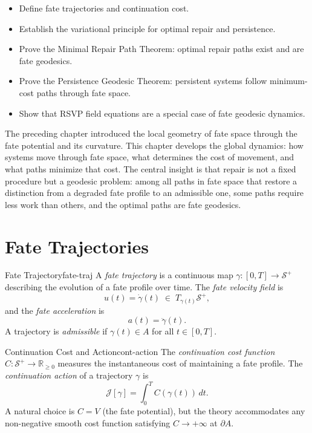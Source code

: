 \documentclass[12pt,twoside,openright]{book}
\newcommand{\fateSpace}{\mathcal{S}}
\newcommand{\admRegion}{A}
\newenvironment{objectives}{%
  \begin{tcolorbox}[colback=DistBlue!5,colframe=DistBlue,
    title={\faCheckCircle\enspace Chapter Objectives},
    fonttitle=\sffamily\bfseries\color{white},
    attach boxed title to top left={yshift=-2mm,xshift=4mm},
    boxed title style={colback=DistBlue},breakable]
  \begin{itemize}[leftmargin=*,nosep]}{%
  \end{itemize}\end{tcolorbox}\vspace{1em}}
\providecommand{\fatePos}{\fateSpace^{+}}
\providecommand{\admRegion}{A}
\providecommand{\fatePot}{V}
\providecommand{\fateTan}[1]{T_{#1}\fatePos}
\providecommand{\contCost}{C}
\providecommand{\contAction}{\mathcal{J}}
\providecommand{\fateTraj}{\gamma}
\providecommand{\fateVel}{u}
\providecommand{\fateAcc}{a}
\begin{document}
\begin{objectives}
\item Define fate trajectories and continuation cost.
\item Establish the variational principle for optimal repair
  and persistence.
\item Prove the Minimal Repair Path Theorem: optimal repair
  paths exist and are fate geodesics.
\item Prove the Persistence Geodesic Theorem: persistent
  systems follow minimum-cost paths through fate space.
\item Show that RSVP field equations are a special case of
  fate geodesic dynamics.
\end{objectives}

The preceding chapter introduced the local geometry of fate
space through the fate potential and its curvature. This
chapter develops the global dynamics: how systems move through
fate space, what determines the cost of movement, and what
paths minimize that cost. The central insight is that repair
is not a fixed procedure but a geodesic problem: among all
paths in fate space that restore a distinction from a degraded
fate profile to an admissible one, some paths require less
work than others, and the optimal paths are fate geodesics.

\section{Fate Trajectories}

\begin{definition}{Fate Trajectory}{fate-traj}
A \emph{fate trajectory} is a continuous map
$\fateTraj:[0,T]\to\fatePos$ describing the evolution of
a fate profile over time. The \emph{fate velocity field} is
\[
  \fateVel(t) = \dot{\fateTraj}(t)
  \;\in\; \fateTan{\fateTraj(t)},
\]
and the \emph{fate acceleration} is
\[
  \fateAcc(t) = \ddot{\fateTraj}(t).
\]
A trajectory is \emph{admissible} if $\fateTraj(t)\in\admRegion$
for all $t\in[0,T]$.
\end{definition}

\begin{definition}{Continuation Cost and Action}{cont-action}
The \emph{continuation cost function}
$\contCost:\fatePos\to\mathbb{R}_{\ge0}$ measures the
instantaneous cost of maintaining a fate profile. The
\emph{continuation action} of a trajectory $\fateTraj$ is
\[
  \contAction[\fateTraj]
  = \int_0^T \contCost(\fateTraj(t))\,dt.
\]
A natural choice is $\contCost = \fatePot$ (the fate potential),
but the theory accommodates any non-negative smooth cost function
satisfying $\contCost\to+\infty$ at $\partial\admRegion$.
\end{definition}
\end{document}
